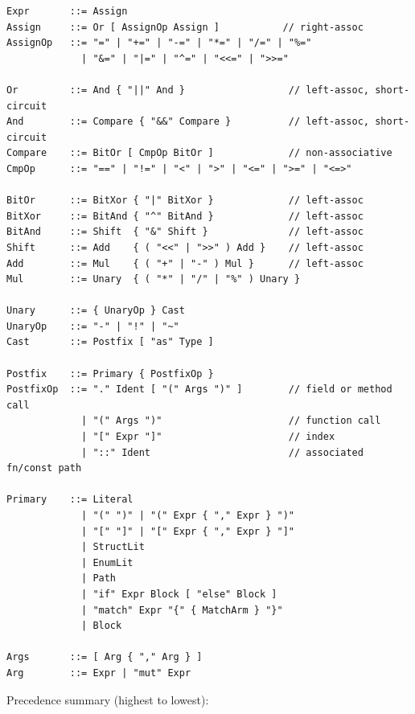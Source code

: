 \documentclass[12pt,oneside]{article}
\begin{document}
\begin{verbatim}
Expr       ::= Assign
Assign     ::= Or [ AssignOp Assign ]           // right-assoc
AssignOp   ::= "=" | "+=" | "-=" | "*=" | "/=" | "%="
             | "&=" | "|=" | "^=" | "<<=" | ">>="

Or         ::= And { "||" And }                  // left-assoc, short-circuit
And        ::= Compare { "&&" Compare }          // left-assoc, short-circuit
Compare    ::= BitOr [ CmpOp BitOr ]             // non-associative
CmpOp      ::= "==" | "!=" | "<" | ">" | "<=" | ">=" | "<=>"

BitOr      ::= BitXor { "|" BitXor }             // left-assoc
BitXor     ::= BitAnd { "^" BitAnd }             // left-assoc
BitAnd     ::= Shift  { "&" Shift }              // left-assoc
Shift      ::= Add    { ( "<<" | ">>" ) Add }    // left-assoc
Add        ::= Mul    { ( "+" | "-" ) Mul }      // left-assoc
Mul        ::= Unary  { ( "*" | "/" | "%" ) Unary }

Unary      ::= { UnaryOp } Cast
UnaryOp    ::= "-" | "!" | "~"
Cast       ::= Postfix [ "as" Type ]

Postfix    ::= Primary { PostfixOp }
PostfixOp  ::= "." Ident [ "(" Args ")" ]        // field or method call
             | "(" Args ")"                      // function call
             | "[" Expr "]"                      // index
             | "::" Ident                        // associated fn/const path

Primary    ::= Literal
             | "(" ")" | "(" Expr { "," Expr } ")"
             | "[" "]" | "[" Expr { "," Expr } "]"
             | StructLit
             | EnumLit
             | Path
             | "if" Expr Block [ "else" Block ]
             | "match" Expr "{" { MatchArm } "}"
             | Block

Args       ::= [ Arg { "," Arg } ]
Arg        ::= Expr | "mut" Expr
\end{verbatim}

Precedence summary (highest to lowest):
\end{document}

